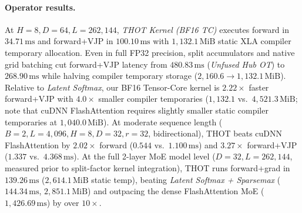 \documentclass[11pt]{article}
\begin{document}
\paragraph{Operator results.}
At $H=8, D=64, L=262{,}144$, \emph{THOT Kernel (BF16 TC)} executes forward in \textbf{$34.71\,\text{ms}$} and forward+VJP in \textbf{$100.10\,\text{ms}$} with $1{,}132.1\,\text{MiB}$ static XLA compiler temporary allocation. Even in full FP32 precision, split accumulators and native grid batching cut forward+VJP latency from $480.83\,\text{ms}$ (\emph{Unfused Hub OT}) to $268.90\,\text{ms}$ while halving compiler temporary storage ($2{,}160.6 \to 1{,}132.1\,\text{MiB}$). Relative to \emph{Latent Softmax}, our BF16 Tensor-Core kernel is $2.22\times$ faster forward+VJP with $4.0\times$ smaller compiler temporaries ($1{,}132.1$ vs.\ $4{,}521.3\,\text{MiB}$; note that cuDNN FlashAttention requires slightly smaller static compiler temporaries at $1{,}040.0\,\text{MiB}$). At moderate sequence length ($B=2, L=4{,}096, H=8, D=32, r=32$, bidirectional), THOT beats cuDNN FlashAttention by $2.02\times$ forward ($0.544$ vs.\ $1.100\,\text{ms}$) and $3.27\times$ forward+VJP ($1.337$ vs.\ $4.368\,\text{ms}$). At the full 2-layer MoE model level ($D=32, L=262{,}144$, measured prior to split-factor kernel integration), THOT runs forward+grad in $139.26\,\text{ms}$ ($2{,}614.1\,\text{MiB}$ static temp), beating \emph{Latent Softmax + Sparsemax} ($144.34\,\text{ms}$, $2{,}851.1\,\text{MiB}$) and outpacing the dense FlashAttention MoE ($1{,}426.69\,\text{ms}$) by over $10\times$.
\end{document}
